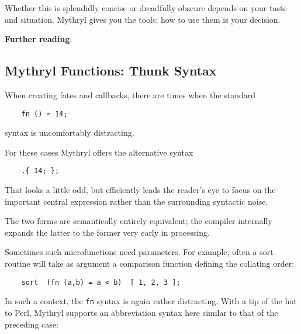 Whether this is splendidly concise or dreadfully obscure 
depends on your taste and situation.  Mythryl gives you 
the tools;  how to use them is your decision.


{\bf Further reading}:

\begin{quotation}
\newline
{}\newline
\end{quotation}

\cutend*

\subsection{Mythryl Functions:  Thunk Syntax}

When creating fates and callbacks, there are times 
when the standard

\begin{verbatim}
    fn () = 14;
\end{verbatim}

syntax is uncomfortably distracting.

For these cases Mythryl offers the alternative syntax

\begin{verbatim}
    .{ 14; };
\end{verbatim}

That looks a little odd, but efficiently leads the reader's eye to focus 
on the important central expression rather than the surrounding syntactic 
noise.

The two forms are semantically entirely equivalent;  the compiler 
internally expands the latter to the former very early in processing.

Sometimes such microfunctions need parameters.  For example, often a sort 
routine will take as argument a comparison function defining the collating 
order:

\begin{verbatim}
    sort  (fn (a,b) = a < b)  [ 1, 2, 3 ];
\end{verbatim}

In such a context, the {\tt fn} syntax is again rather distracting. 
With a tip of the hat to Perl, Mythryl supports an abbreviation 
syntax here similar to that of the preceding case:

